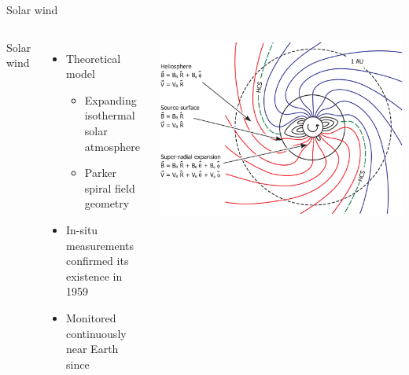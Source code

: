 \begin{frame}[plain,c]{Solar wind}{}
	\begin{columns}[c]
		
		Solar wind
		\begin{itemize}
			\item Theoretical model \citep{Parker1958}
			\begin{itemize}
				\item Expanding isothermal solar atmosphere
				\item Parker spiral field geometry
			\end{itemize}
			\item<3-> In-situ measurements confirmed its existence in 1959
			\item<3-> Monitored continuously near Earth since
		\end{itemize}
		
		
		\includegraphics[width=\textwidth]{../figures_of_others/images/Owens2013_PFSS_Sectors_screenshot.png}
		
	\end{columns}
\end{frame}
